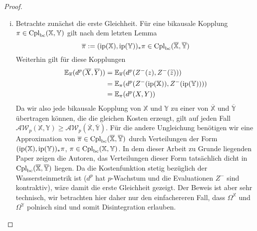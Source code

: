 \begin{proof}
\begin{enumerate}[(i)]
\item Betrachte zunächst die erste Gleichheit. Für eine bikausale Kopplung $\pi \in \operatorname{Cpl}_{\operatorname{bc}}(\mathbb{X}, \mathbb{Y})$ gilt nach dem letzten Lemma 
$$\overline{\pi}:=(\operatorname{ip}(\mathbb{X}), \operatorname{ip}(\mathbb{Y}))_*\pi \in \operatorname{Cpl}_{\operatorname{bc}}(\overline{\mathbb{X}}, \overline{\mathbb{Y}})$$
Weiterhin gilt für diese Kopplungen
\begin{align*}
    \mathbb{E}_{\overline{\pi}}(d^p(\overline{X}, \overline{Y}))&=\mathbb{E}_{\overline{\pi}}(d^p(Z^-(z), Z^-(\widetilde{z}))) \\
    &= \mathbb{E}_\pi(d^p(Z^-(\operatorname{ip}(\mathbb{X})), Z^-(\operatorname{ip}(\mathbb{Y})))) \\
    &= \mathbb{E}_\pi(d^p(X, Y))
\end{align*}
Da wir also jede bikausale Kopplung von $\mathbb{X}$ und $\mathbb{Y}$ zu einer von $\overline{\mathbb{X}}$ und $\overline{\mathbb{Y}}$ übertragen können, die die gleichen Kosten erzeugt, gilt auf jeden Fall \\
$\mathcal{AW}_p(\mathbb{X}, \mathbb{Y}) \geq \mathcal{AW}_p(\overline{\mathbb{X}}, \overline{\mathbb{Y}})$. Für die andere Ungleichung benötigen wir eine Approximation von $\overline{\pi} \in \operatorname{Cpl}_{\operatorname{bc}}(\overline{\mathbb{X}}, \overline{\mathbb{Y}})$ durch Verteilungen der Form $(\operatorname{ip}(\mathbb{X}), \operatorname{ip}(\mathbb{Y}))_*\pi$, $\pi \in \operatorname{Cpl}_{\operatorname{bc}}(\mathbb{X}, \mathbb{Y})$. In dem dieser Arbeit zu Grunde liegenden Paper zeigen die Autoren, das Verteilungen dieser Form tatsächlich dicht in $\operatorname{Cpl}_{\operatorname{bc}}(\overline{\mathbb{X}}, \overline{\mathbb{Y}})$ liegen. Da die Kostenfunktion stetig bezüglich der Wassersteinmetrik ist ($d^p$ hat $p$-Wachstum und die Evaluationen $Z^-$ sind kontraktiv), wäre damit die erste Gleichheit gezeigt. Der Beweis ist aber sehr technisch, wir betrachten hier daher nur den einfachereren Fall, dass $\Omega^\mathbb{X}$ und $\Omega^\mathbb{Y}$ polnisch sind und somit Disintegration erlauben. 


\end{enumerate}
\end{proof}
